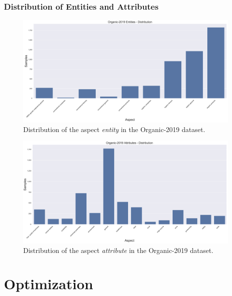 \subsubsection*{Distribution of Entities and Attributes}

\begin{figure}[H]
	\centering
	\includegraphics[width=\textwidth]{figures/05_setup/05_organicEntities}
	\caption{Distribution of the aspect \textit{entity} in the Organic-2019 dataset.}
	\label{fig:05_organic2019_Entities}
\end{figure}

\begin{figure}[H]
	\centering
	\includegraphics[width=\textwidth]{figures/05_setup/05_organicAttributes}
	\caption{Distribution of the aspect \textit{attribute} in the Organic-2019 dataset.}
	\label{fig:05_organic2019_Attributes}
\end{figure}

	

\section{Optimization}

